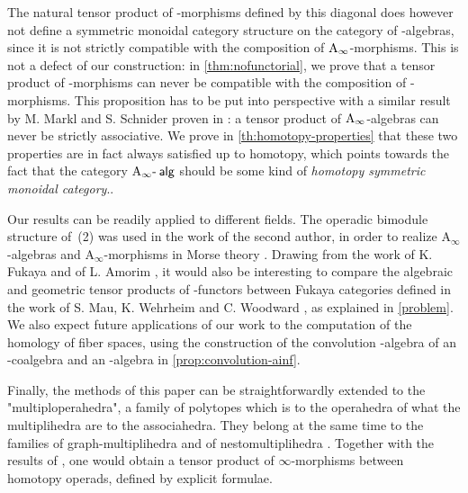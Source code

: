 \documentclass[twoside, 11pt]{amsart}
\theoremstyle{remark}
\begin{document}
The natural tensor product of \Ainf -morphisms defined by this diagonal does however not define a symmetric monoidal category structure on the category of \Ainf -algebras, since it is not strictly compatible with the composition of $\mathrm{A}_\infty$-morphisms. 
This is not a defect of our construction: in \cref{thm:nofunctorial}, we prove that a tensor product of \Ainf -morphisms can never be compatible with the composition of \Ainf -morphisms. 
This proposition has to be put into perspective with a similar result by M. Markl and S. Schnider proven in \cite[Theorem 13]{MarklShnider06}: a tensor product of $\mathrm{A}_\infty$-algebras can never be strictly associative.
We prove in \cref{th:homotopy-properties} that these two properties are in fact always satisfied up to homotopy, which points towards the fact that the category $\mathrm{A}_\infty\text{-\hspace{2pt}}\mathsf{alg}$ should be some kind of \textit{homotopy symmetric monoidal category}.. 

\medskip

Our results can be readily applied to different fields. 
The operadic bimodule structure of~(2) was used in the work of the second author, in order to realize $\mathrm{A}_\infty$-algebras and $\mathrm{A}_\infty$-morphisms in Morse theory \cite{mazuir-I,mazuir-II}. 
Drawing from the work of K. Fukaya \cite{fukaya-unobstructed} and of L. Amorim \cite{amorim-lagrangian}, it would also be interesting to compare the algebraic and geometric tensor products of \Ainf -functors between Fukaya categories defined in the work of S. Mau, K. Wehrheim and C. Woodward \cite{mau-wehrheim-woodward}, as explained in \cref{problem}. 
We also expect future applications of our work to the computation of the homology of fiber spaces, using the construction of the convolution \Ainf -algebra of an \Ainf -coalgebra and an \Ainf -algebra in \cref{prop:convolution-ainf}.

\medskip

Finally, the methods of this paper can be straightforwardly extended to the "multiploperahedra", a family of polytopes which is to the operahedra of \cite{LA21} what the multiplihedra are to the associahedra. 
They belong at the same time to the families of graph-multiplihedra \cite{DevadossForcey08} and of nestomultiplihedra \cite{AD13}.  
Together with the results of \cite{LA21}, one would obtain a tensor product of $\infty$-morphisms between homotopy operads, defined by explicit formulae. 
\end{document}
